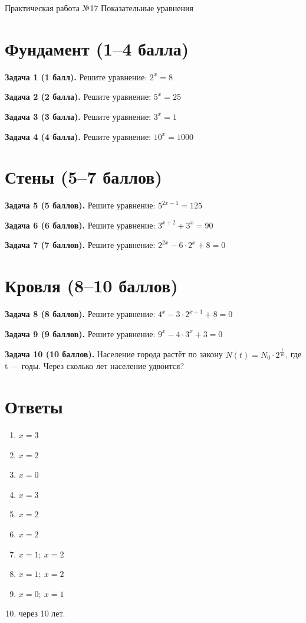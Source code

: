 \documentclass{umk-matematika}
\begin{document}
\maketitlepage
    {Практическая работа №17}
    {Показательные уравнения}
    {}

\section{Фундамент (1--4 балла)}

\textbf{Задача 1 (1 балл).} Решите уравнение: $2^x = 8$

\textbf{Задача 2 (2 балла).} Решите уравнение: $5^x = 25$

\textbf{Задача 3 (3 балла).} Решите уравнение: $3^x = 1$

\textbf{Задача 4 (4 балла).} Решите уравнение: $10^x = 1000$

\section{Стены (5--7 баллов)}

\textbf{Задача 5 (5 баллов).} Решите уравнение: $5^{2x-1} = 125$

\textbf{Задача 6 (6 баллов).} Решите уравнение: $3^{x+2} + 3^x = 90$

\textbf{Задача 7 (7 баллов).} Решите уравнение: $2^{2x} - 6 \cdot 2^x + 8 = 0$

\section{Кровля (8--10 баллов)}

\textbf{Задача 8 (8 баллов).} Решите уравнение: $4^x - 3 \cdot 2^{x+1} + 8 = 0$

\textbf{Задача 9 (9 баллов).} Решите уравнение: $9^x - 4 \cdot 3^x + 3 = 0$

\textbf{Задача 10 (10 баллов).} Население города растёт по закону $N(t) = N_0 \cdot 2^{\frac{t}{10}}$, где t — годы. Через сколько лет население удвоится?

\newpage
\section*{Ответы}

\begin{enumerate}
  \item $x = 3$
  \item $x = 2$
  \item $x = 0$
  \item $x = 3$
  \item $x = 2$
  \item $x = 2$
  \item $x = 1;\ x = 2$
  \item $x = 1;\ x = 2$
  \item $x = 0;\ x = 1$
  \item через 10 лет.
\end{enumerate}
\end{document}
